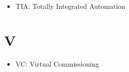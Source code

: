 \documentclass[
	spanish, %
	letterpaper, oneside, openany
]{book}
\begin{document}
\begin{itemize}

    \item TIA: Totally Integrated Automation

\end{itemize}


\section*{V}

\begin{itemize}

    \item VC: Virtual Commissioning

\end{itemize}

\templateFinalcfg


% 










\end{document}

